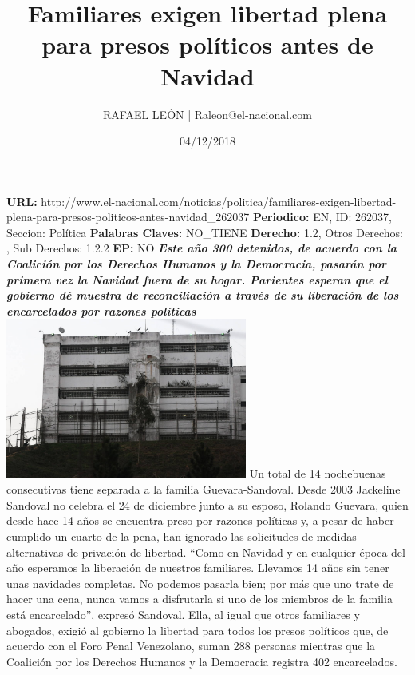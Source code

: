 \documentclass{article}%
\title{\textbf{Familiares exigen libertad plena para presos políticos antes de Navidad}}%
\author{RAFAEL LEÓN | Raleon@el{-}nacional.com}%
\date{04/12/2018}%
\begin{document}
%
\normalsize%
\maketitle%
\textbf{URL: }%
http://www.el{-}nacional.com/noticias/politica/familiares{-}exigen{-}libertad{-}plena{-}para{-}presos{-}politicos{-}antes{-}navidad\_262037\newline%
%
\textbf{Periodico: }%
EN, %
ID: %
262037, %
Seccion: %
Política\newline%
%
\textbf{Palabras Claves: }%
NO\_TIENE\newline%
%
\textbf{Derecho: }%
1.2, %
Otros Derechos: %
, %
Sub Derechos: %
1.2.2\newline%
%
\textbf{EP: }%
NO\newline%
\newline%
%
\textbf{\textit{Este año 300 detenidos, de acuerdo con la Coalición por los Derechos Humanos y la Democracia, pasarán por primera vez la Navidad fuera de su hogar. Parientes esperan que el gobierno dé muestra de reconciliación a través de su liberación de los encarcelados por razones políticas}}%
\newline%
\newline%
%
\includegraphics[width=300px]{215.jpg}%
\newline%
%
Un total de 14 nochebuenas consecutivas tiene separada a la familia Guevara{-}Sandoval. Desde 2003 Jackeline Sandoval no celebra el 24 de diciembre junto a su esposo, Rolando Guevara, quien desde hace 14 años se encuentra preso por razones políticas y, a pesar de haber cumplido un cuarto de la pena, han ignorado las solicitudes de medidas alternativas de privación de libertad.%
\newline%
%
“Como en Navidad y en cualquier época del año esperamos la liberación de nuestros familiares. Llevamos 14 años sin tener unas navidades completas. No podemos pasarla bien; por más que uno trate de hacer una cena, nunca vamos a disfrutarla si uno de los miembros de la familia está encarcelado”, expresó Sandoval. Ella, al igual que otros familiares y abogados, exigió al gobierno la libertad para todos los presos políticos que, de acuerdo con el Foro Penal Venezolano, suman 288 personas mientras que la Coalición por los Derechos Humanos y la Democracia registra 402 encarcelados.%
\end{document}
